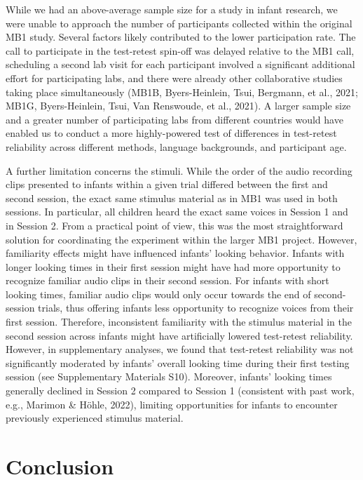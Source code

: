 \documentclass[
  man,floatsintext]{apa6}
\begin{document}
While we had an above-average sample size for a study in infant research, we were unable to approach the number of participants collected within the original MB1 study.
Several factors likely contributed to the lower participation rate.
The call to participate in the test-retest spin-off was delayed relative to the MB1 call, scheduling a second lab visit for each participant involved a significant additional effort for participating labs, and there were already other collaborative studies taking place simultaneously (MB1B, Byers-Heinlein, Tsui, Bergmann, et al., 2021; MB1G, Byers-Heinlein, Tsui, Van Renswoude, et al., 2021).
A larger sample size and a greater number of participating labs from different countries would have enabled us to conduct a more highly-powered test of differences in test-retest reliability across different methods, language backgrounds, and participant age.

A further limitation concerns the stimuli.
While the order of the audio recording clips presented to infants within a given trial differed between the first and second session, the exact same stimulus material as in MB1 was used in both sessions.
In particular, all children heard the exact same voices in Session 1 and in Session 2.
From a practical point of view, this was the most straightforward solution for coordinating the experiment within the larger MB1 project.
However, familiarity effects might have influenced infants' looking behavior.
Infants with longer looking times in their first session might have had more opportunity to recognize familiar audio clips in their second session.
For infants with short looking times, familiar audio clips would only occur towards the end of second-session trials, thus offering infants less opportunity to recognize voices from their first session.
Therefore, inconsistent familiarity with the stimulus material in the second session across infants might have artificially lowered test-retest reliability.
However, in supplementary analyses, we found that test-retest reliability was not significantly moderated by infants' overall looking time during their first testing session (see Supplementary Materials S10).
Moreover, infants' looking times generally declined in Session 2 compared to Session 1 (consistent with past work, e.g., Marimon \& Höhle, 2022), limiting opportunities for infants to encounter previously experienced stimulus material.

\hypertarget{conclusion}{%
\section{Conclusion}\label{conclusion}}
\end{document}
